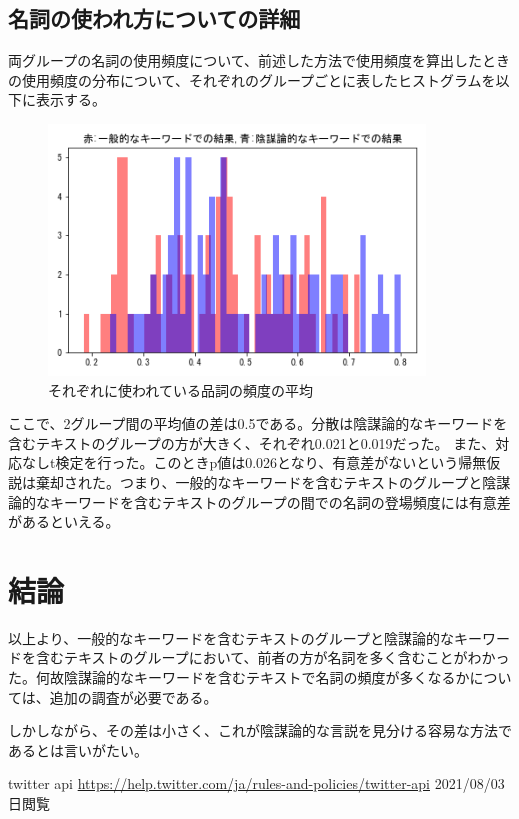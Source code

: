 \documentclass[a4paper, dvipdfmx]{jsarticle}
\begin{document}
\subsection{名詞の使われ方についての詳細}
両グループの名詞の使用頻度について、前述した方法で使用頻度を算出したときの使用頻度の分布について、それぞれのグループごとに表したヒストグラムを以下に表示する。
\begin{figure}[H]
\begin{center}
\includegraphics[width=100mm]{../images/fig4.png}
\caption{それぞれに使われている品詞の頻度の平均}
\end{center}
\end{figure}
ここで、2グループ間の平均値の差は0.5である。分散は陰謀論的なキーワードを含むテキストのグループの方が大きく、それぞれ0.021と0.019だった。
また、対応なしt検定を行った。このときp値は0.026となり、有意差がないという帰無仮説は棄却された。つまり、一般的なキーワードを含むテキストのグループと陰謀論的なキーワードを含むテキストのグループの間での名詞の登場頻度には有意差があるといえる。
\section{結論}
以上より、一般的なキーワードを含むテキストのグループと陰謀論的なキーワードを含むテキストのグループにおいて、前者の方が名詞を多く含むことがわかった。何故陰謀論的なキーワードを含むテキストで名詞の頻度が多くなるかについては、追加の調査が必要である。
\par
しかしながら、その差は小さく、これが陰謀論的な言説を見分ける容易な方法であるとは言いがたい。
\begin{thebibliography}{10}
   twitter api \url{https://help.twitter.com/ja/rules-and-policies/twitter-api} 2021/08/03日閲覧
\end{thebibliography}
\end{document}
